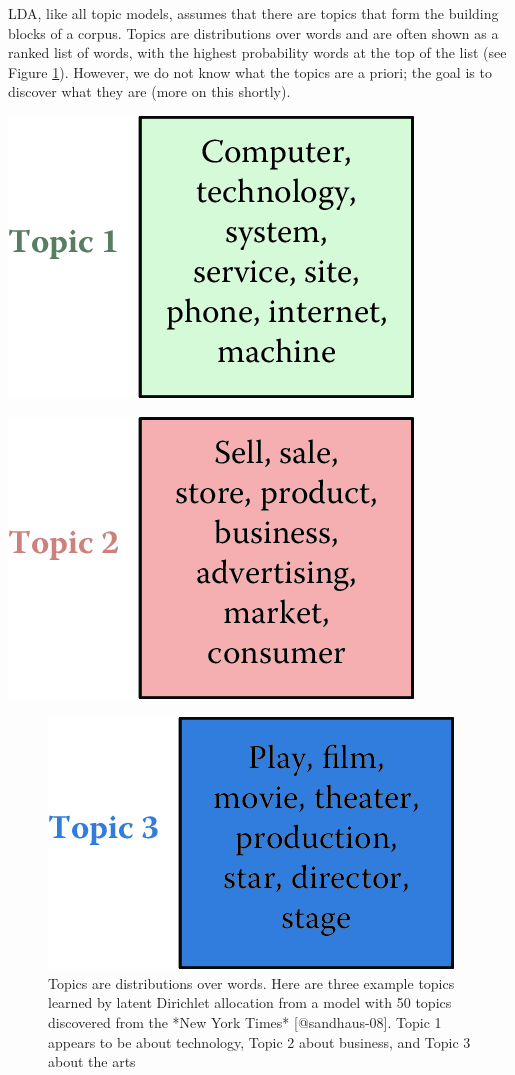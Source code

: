 \documentclass[]{krantz}
\begin{document}
LDA, like all topic models, assumes that there are topics that form the
building blocks of a corpus. Topics are distributions over words and are
often shown as a ranked list of words, with the highest probability
words at the top of the list (see Figure \ref{fig:nyt-topics-3}).
However, we do not know what the topics are a priori; the goal is to
discover what they are (more on this shortly).

\begin{center}\includegraphics[width=0.5\linewidth]{ChapterText/figures/nyt_topics-1} \end{center}

\begin{center}\includegraphics[width=0.5\linewidth]{ChapterText/figures/nyt_topics-2} \end{center}

\begin{figure}

{\centering \includegraphics[width=0.5\linewidth]{ChapterText/figures/nyt_topics-3} 

}

\caption{Topics are distributions over words. Here are three example topics learned by latent Dirichlet allocation from a model with 50 topics discovered from the *New York Times* [@sandhaus-08]. Topic 1 appears to be about technology, Topic 2 about business, and Topic 3 about the arts}\label{fig:nyt-topics-3}
\end{figure}
\end{document}
